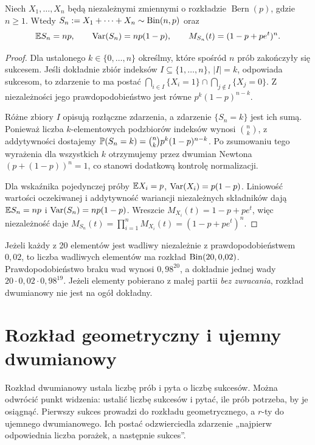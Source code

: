 \begin{twierdzenie}
Niech $X_1,\ldots,X_n$ będą niezależnymi zmiennymi o rozkładzie
$\operatorname{Bern}(p)$, gdzie $n\geq1$. Wtedy
$S_n:=X_1+\cdots+X_n\sim\operatorname{Bin}(n,p)$ oraz
\[
\mathbb{E} S_n=np,\qquad \operatorname{Var}(S_n)=np(1-p),\qquad
M_{S_n}(t)=(1-p+pe^t)^n.
\]
\end{twierdzenie}
\begin{proof}
Dla ustalonego $k\in\{0,\ldots,n\}$ określmy,
które spośród $n$ prób zakończyły się sukcesem.
Jeśli dokładnie zbiór indeksów $I\subseteq\{1,\ldots,n\}$,
$|I|=k$, odpowiada sukcesom, to zdarzenie to ma postać
$\bigcap_{i\in I}\{X_i=1\}\cap
\bigcap_{j\notin I}\{X_j=0\}$.
Z niezależności jego prawdopodobieństwo jest równe
$p^k(1-p)^{n-k}$.

Różne zbiory $I$ opisują rozłączne zdarzenia,
a zdarzenie $\{S_n=k\}$ jest ich sumą. Ponieważ
liczba $k$-elementowych podzbiorów indeksów wynosi
$\binom nk$, z addytywności dostajemy
$\mathbb{P}(S_n=k)=\binom nk p^k(1-p)^{n-k}$.
Po zsumowaniu tego wyrażenia dla wszystkich $k$
otrzymujemy przez dwumian Newtona
$(p+(1-p))^n=1$, co stanowi dodatkową kontrolę normalizacji.

Dla wskaźnika pojedynczej próby
$\mathbb{E} X_i=p$, $\operatorname{Var}(X_i)=p(1-p)$.
Liniowość wartości oczekiwanej i addytywność
wariancji niezależnych składników dają
$\mathbb{E} S_n=np$ i $\operatorname{Var}(S_n)=np(1-p)$.
Wreszcie $M_{X_i}(t)=1-p+pe^t$, więc niezależność daje
$M_{S_n}(t)=\prod_{i=1}^nM_{X_i}(t)
=(1-p+pe^t)^n$.
\end{proof}

\begin{przyklad}
Jeżeli każdy z 20 elementów jest wadliwy niezależnie z
prawdopodobieństwem $0{,}02$, to liczba wadliwych elementów
ma rozkład $\operatorname{Bin}(20,0{,}02)$. Prawdopodobieństwo
braku wad wynosi $0{,}98^{20}$, a dokładnie jednej wady
$20\cdot0{,}02\cdot0{,}98^{19}$.
Jeżeli elementy pobierano z małej partii \emph{bez zwracania},
rozkład dwumianowy nie jest na ogół dokładny.
\end{przyklad}

\section{Rozkład geometryczny i ujemny dwumianowy}
Rozkład dwumianowy ustala liczbę prób i pyta o liczbę sukcesów.
Można odwrócić punkt widzenia: ustalić liczbę sukcesów i
pytać, ile prób potrzeba, by je osiągnąć. Pierwszy sukces
prowadzi do rozkładu geometrycznego, a $r$-ty do ujemnego
dwumianowego. Ich postać odzwierciedla zdarzenie
„najpierw odpowiednia liczba porażek, a następnie sukces”.

